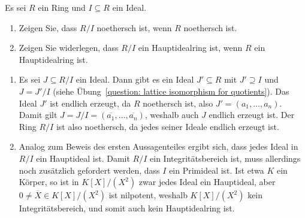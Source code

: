 \begin{question}
  Es sei $R$ ein Ring und $I \subseteq R$ ein Ideal.
  \begin{enumerate}
    \item
      Zeigen Sie, dass $R/I$ noethersch ist, wenn $R$ noethersch ist.
    \item
      Zeigen Sie widerlegen, dass $R/I$ ein Hauptidealring ist, wenn $R$ ein Hauptidealring ist.
  \end{enumerate}
\end{question}


\begin{solution}
  \begin{enumerate}
    \item
      Es sei $J \subseteq R/I$ ein Ideal.
      Dann gibt es ein Ideal $J' \subseteq R$ mit $J' \supseteq I$ und $J = J'/I$ (siehe Übung~\ref{question: lattice isomorphism for quotients}).
      Das Ideal $J'$ ist endlich erzeugt, da $R$ noethersch ist, also $J' = (a_1, \dotsc, a_n)$.
      Damit gilt $J = J/I = (\overline{a_1}, \dotsc, \overline{a_n})$, weshalb auch $J$ endlich erzeugt ist.
      Der Ring $R/I$ ist also noethersch, da jedes seiner Ideale endlich erzeugt ist.
    \item
      Analog zum Beweis des ersten Aussagenteiles ergibt sich, dass jedes Ideal in $R/I$ ein Hauptideal ist.
      Damit $R/I$ ein Integritätsbereich ist, muss allerdings noch zusätzlich gefordert werden, dass $I$ ein Primideal ist.
      Ist etwa $K$ ein Körper, so ist in $K[X]/(X^2)$ zwar jedes Ideal ein Hauptideal, aber $0 \neq \overline{X} \in K[X]/(X^2)$ ist nilpotent, weshalb $K[X]/(X^2)$ kein Integritätsbereich, und somit auch kein Hauptidealring ist.
  \end{enumerate}
\end{solution}




